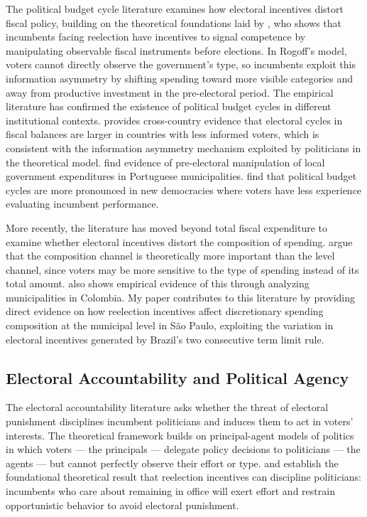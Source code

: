 \documentclass[12pt, a4paper]{article}
\begin{document}
The political budget cycle literature examines how electoral incentives distort fiscal policy, building on the theoretical foundations laid by , who shows that incumbents facing reelection have incentives to signal competence by manipulating observable fiscal instruments before elections. In Rogoff's model, voters cannot directly observe the government's type, so incumbents exploit this information asymmetry by shifting spending toward more visible categories and away from productive investment in the pre-electoral period. The empirical literature has confirmed the existence of political budget cycles in different institutional contexts.  provides cross-country evidence that electoral cycles in fiscal balances are larger in countries with less informed voters, which is consistent with the information asymmetry mechanism exploited by politicians in the theoretical model.  find evidence of pre-electoral manipulation of local government expenditures in Portuguese municipalities.  find that political budget cycles are more pronounced in new democracies where voters have less experience evaluating incumbent performance.

More recently, the literature has moved beyond total fiscal expenditure to examine whether electoral incentives distort the composition of spending.  argue that the composition channel is theoretically more important than the level channel, since voters may be more sensitive to the type of spending instead of its total amount.  also shows empirical evidence of this through analyzing municipalities in Colombia. My paper contributes to this literature by providing direct evidence on how reelection incentives affect discretionary spending composition at the municipal level in São Paulo, exploiting the variation in electoral incentives generated by Brazil's two consecutive term limit rule.

\subsection*{Electoral Accountability and Political Agency}

The electoral accountability literature asks whether the threat of electoral punishment disciplines incumbent politicians and induces them to act in voters' interests. The theoretical framework builds on principal-agent models of politics in which voters --- the principals --- delegate policy decisions to politicians --- the agents --- but cannot perfectly observe their effort or type.  and  establish the foundational theoretical result that reelection incentives can discipline politicians: incumbents who care about remaining in office will exert effort and restrain opportunistic behavior to avoid electoral punishment.
\end{document}
